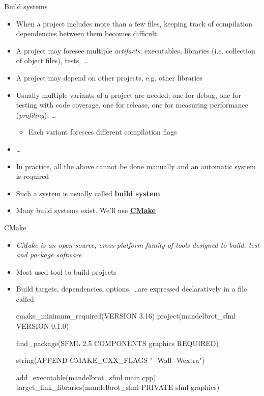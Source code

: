 \begin{frame}{Build systems}

  \begin{itemize}
  \item When a project includes more than a few files, keeping track of
    compilation dependencies between them becomes difficult
  \item A project may foresee multiple \textit{artifacts}: executables,
    libraries (i.e. collection of object files), tests, \ldots
  \item A project may depend on other projects, e.g. other libraries
  \item Usually multiple variants of a project are needed: one for debug, one
    for testing with code coverage, one for release, one for measuring
    performance (\textit{profiling}), \ldots
    \begin{itemize}
    \item Each variant foresees different compilation flags
    \end{itemize}
  \item \ldots
  \end{itemize}

  \begin{itemize}
  \item In practice, all the above cannot be done manually and an automatic
    system is required
  \item Such a system is usually called \textbf{build system}
  \item Many build systems exist. We'll use
    \href{https://cmake.org}{\textbf{CMake}}
  \end{itemize}

\end{frame}

\begin{frame}[fragile]{CMake}
  \begin{itemize}
  \item \textit{CMake is an open-source, cross-platform family of tools designed
      to build, test and package software}
  \item Most used tool to build \Cpp{} projects
  \item Build targets, dependencies, options, \ldots are expressed declaratively
    in a file called 
    \begin{codeblock}{
cmake_minimum_required(VERSION 3.16)
project(mandelbrot_sfml VERSION 0.1.0)

find_package(SFML 2.5 COMPONENTS graphics REQUIRED)

string(APPEND CMAKE_CXX_FLAGS " -Wall -Wextra")

add_executable(mandelbrot_sfml main.cpp)
target_link_libraries(mandelbrot_sfml PRIVATE sfml-graphics)
}\end{codeblock}

  \end{itemize}
\end{frame}
